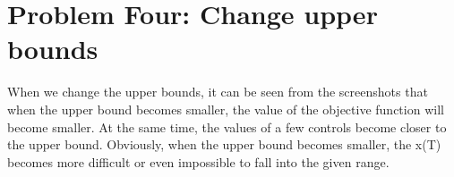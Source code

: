 \documentclass{mcmthesis}
\begin{document}
\section{Problem Four: Change upper bounds}
When we change the upper bounds, it can be seen from the screenshots that when the upper bound becomes smaller, the value of the objective function will become smaller. At the same time, the values of a few controls become closer to the upper bound. Obviously, when the upper bound becomes smaller, the x(T) becomes more difficult or even impossible to fall into the given range.
\begin{figure}[H]
\centering

%
%


\end{figure}
\end{document}
